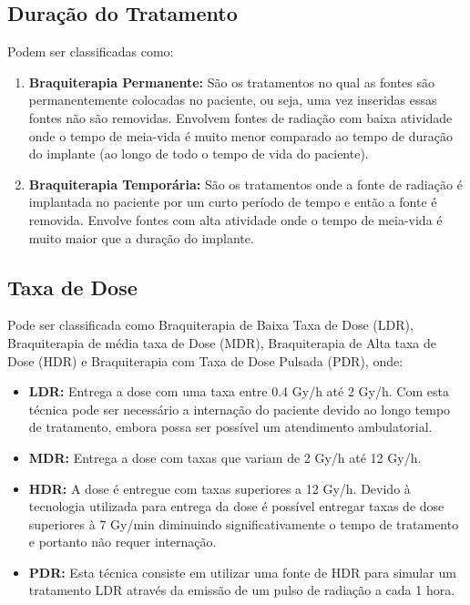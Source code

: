 \documentclass[11pt,a4paper]{article}
\begin{document}
		\subsection{Duração do Tratamento}

			Podem ser classificadas como:

			\begin{enumerate}

				\item \textbf{Braquiterapia Permanente:}  São os tratamentos no qual as fontes são permanentemente colocadas no paciente, ou seja, uma vez inseridas essas fontes não são removidas. Envolvem fontes de radiação com baixa atividade onde o tempo de meia-vida é muito menor comparado ao tempo de duração do implante (ao longo de todo o tempo de vida do paciente).
				
				\item \textbf{Braquiterapia Temporária:} São os tratamentos onde a fonte de radiação é implantada no paciente por um curto período de tempo e então a fonte é removida. Envolve fontes com alta atividade onde o tempo de meia-vida é muito maior que a duração do implante.
				
			\end{enumerate}

		\subsection{Taxa de Dose}

			Pode ser classificada como Braquiterapia de Baixa Taxa de Dose (LDR), Braquiterapia de média taxa de Dose (MDR), Braquiterapia de Alta taxa de Dose (HDR) e Braquiterapia com Taxa de Dose Pulsada (PDR), onde:

			\begin{itemize}
				\item \textbf{LDR:} Entrega a dose com uma taxa entre 0.4 Gy/h até 2 Gy/h. Com esta técnica pode ser necessário a internação do paciente devido ao longo tempo de tratamento, embora possa ser possível um atendimento ambulatorial.
				\item \textbf{MDR:} Entrega a dose com taxas que variam de 2 Gy/h até 12 Gy/h.
				\item  \textbf{HDR:} A dose é entregue com taxas superiores a 12 Gy/h. Devido à tecnologia utilizada para entrega da dose é possível entregar taxas de dose superiores à 7 Gy/min diminuindo significativamente o tempo de tratamento e portanto não requer internação. 
				\item \textbf{PDR:} Esta técnica consiste em utilizar uma fonte de HDR para simular um tratamento LDR através da emissão de um pulso de radiação a cada 1 hora.
			\end{itemize}
\end{document}
